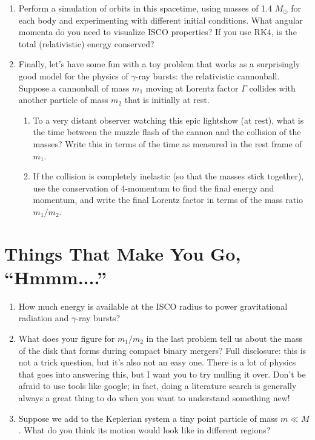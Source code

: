 \documentclass[11pt]{article}
\begin{document}
\begin{enumerate}
\item Perform a simulation of orbits in this spacetime, using masses of 1.4 $M_{\odot}$ for each body and experimenting with different initial conditions. What angular momenta do you need to visualize ISCO properties? If you use RK4, is the total (relativistic) energy conserved?

\item Finally, let's have some fun with a toy problem that works as a surprisingly good model for the physics of $\gamma$-ray bursts: the relativistic cannonball. Suppose a cannonball of mass $m_1$ moving at Lorentz factor $\Gamma$ collides with another particle of mass $m_2$ that is initially at rest.
\begin{enumerate}
\item To a very distant observer watching this epic lightshow (at rest), what is the time between the muzzle flash of the cannon and the collision of the masses? Write this in terms of the time as measured in the rest frame of $m_1$.

\item If the collision is completely inelastic (so that the masses stick together), use the conservation of 4-momentum to find the final energy and momentum, and write the final Lorentz factor in terms of the mass ratio $m_1/m_2$.
\end{enumerate}

\end{enumerate}


\section*{Things That Make You Go, ``Hmmm....''}

\begin{enumerate}

\item How much energy is available at the ISCO radius to power gravitational radiation and $\gamma$-ray bursts?

\item What does your figure for $m_1/m_2$ in the last problem tell us about the mass of the disk that forms during compact binary mergers? Full disclosure: this is not a trick question, but it's also not an easy one. There is a lot of physics that goes into answering this, but I want you to try mulling it over. Don't be afraid to use tools like google; in fact, doing a literature search is generally always a great thing to do when you want to understand something new!

\item Suppose we add to the Keplerian system a tiny point particle of mass $m \ll M$. What do you think its motion would look like in different regions?

\end{enumerate}
\end{document}
